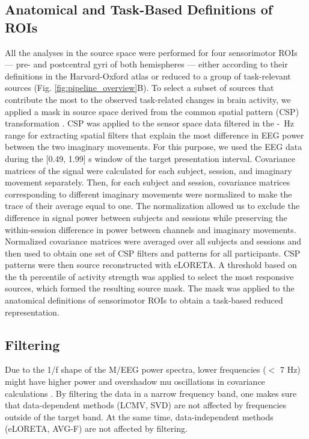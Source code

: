 \subsection{Anatomical and Task-Based Definitions of ROIs}

All the analyses in the source space were performed for four sensorimotor ROIs --- pre- and postcentral gyri of both hemispheres --- either according to their definitions in the Harvard-Oxford atlas \citep{Frazier2005HOA, Desikan2006HOA, Makris2006HOA, Goldstein2007HOA, Jenkinson2012FSL} or reduced to a group of task-relevant sources (Fig. \ref{fig:pipeline_overview}B). To select a subset of sources that contribute the most to the observed task-related changes in brain activity, we applied a mask in source space derived from the common spatial pattern (CSP) transformation \citep{Koles1990, Ramoser2000}. CSP was applied to the sensor space data filtered in the \muLow-\muHigh~Hz range for extracting spatial filters that explain the most difference in EEG power between the two imaginary movements. For this purpose, we used the EEG data during the [0.49, 1.99] s window of the target presentation interval. Covariance matrices of the signal were calculated for each subject, session, and imaginary movement separately. Then, for each subject and session, covariance matrices corresponding to different imaginary movements were normalized to make the trace of their average equal to one. The normalization allowed us to exclude the difference in signal power between subjects and sessions while preserving the within-session difference in power between channels and imaginary movements. Normalized covariance matrices were averaged over all subjects and sessions and then used to obtain one set of CSP filters and patterns for all participants. CSP patterns were then source reconstructed with eLORETA. A threshold based on the \cspSourceThreshold th percentile of activity strength was applied to select the most responsive sources, which formed the resulting source mask. The mask was applied to the anatomical definitions of sensorimotor ROIs to obtain a task-based reduced representation.

\subsection{Filtering}

Due to the 1/f shape of the M/EEG power spectra, lower frequencies ($<$ 7 Hz) might have higher power and overshadow mu oscillations in covariance calculations \citep{Chalas2022}. By filtering the data in a narrow frequency band, one makes sure that data-dependent methods (LCMV, SVD) are not affected by frequencies outside of the target band. At the same time, data-independent methods (eLORETA, AVG-F) are not affected by filtering.

